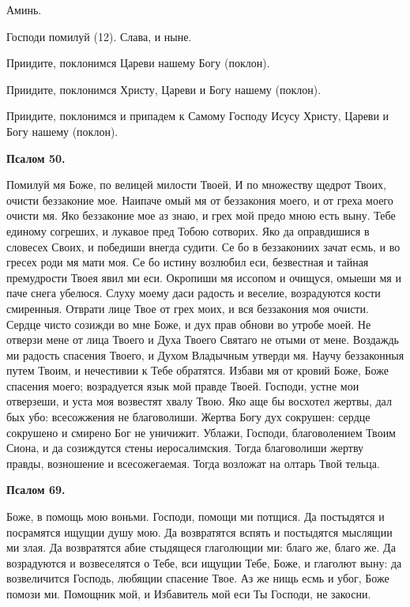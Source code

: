Аминь.

Господи помилуй (12). Слава, и ныне.

Приидите, поклонимся Цареви нашему Богу (поклон).

Приидите, поклонимся Христу, Цареви и Богу нашему (поклон).

Приидите, поклонимся и припадем к Самому Господу Исусу Христу, Цареви и Богу нашему (поклон).


\medskip


\bfseries Псалом 50.\normalfont{}\nopagebreak


Помилуй мя Боже, по велицей милости Твоей, И по множеству щедрот Твоих, очисти беззаконие мое. Наипаче омый мя от беззакония моего, и от греха моего очисти мя. Яко беззаконие мое аз знаю, и грех мой предо мною есть выну. Тебе единому согреших, и лукавое пред Тобою сотворих. Яко да оправдишися в словесех Своих, и победиши внегда судити. Се бо в беззакониих зачат есмь, и во гресех роди мя мати моя. Се бо истину возлюбил еси, безвестная и тайная премудрости Твоея явил ми еси. Окропиши мя иссопом и очищуся, омыеши мя и паче снега убелюся. Слуху моему даси радость и веселие, возрадуются кости смиренныя. Отврати лице Твое от грех моих, и вся беззакония моя очисти. Сердце чисто созижди во мне Боже, и дух прав обнови во утробе моей. Не отверзи мене от лица Твоего и Духа Твоего Святаго не отыми от мене. Воздаждь ми радость спасения Твоего, и Духом Владычным утверди мя. Научу беззаконныя путем Твоим, и нечестивии к Тебе обратятся. Избави мя от кровий Боже, Боже спасения моего; возрадуется язык мой правде Твоей. Господи, устне мои отверзеши, и уста моя возвестят хвалу Твою. Яко аще бы восхотел жертвы, дал бых убо: всесожжения не благоволиши. Жертва Богу дух сокрушен: сердце сокрушено и смирено Бог не уничижит. Ублажи, Господи, благоволением Твоим Сиона, и да созиждутся стены иеросалимския. Тогда благоволиши жертву правды, возношение и всесожегаемая. Тогда возложат на олтарь Твой тельца.


\medskip


\bfseries Псалом 69.\normalfont{}\nopagebreak


Боже, в помощь мою воньми. Господи, помощи ми потщися. Да постыдятся и посрамятся ищущии душу мою. Да возвратятся вспять и постыдятся мыслящии ми злая. Да возвратятся абие стыдящеся глаголющии ми: благо же, благо же. Да возрадуются и возвеселятся о Тебе, вси ищущии Тебе, Боже, и глаголют выну: да возвеличится Господь, любящии спасение Твое. Аз же нищь есмь и убог, Боже помози ми. Помощник мой, и Избавитель мой еси Ты  Господи, не закосни.


